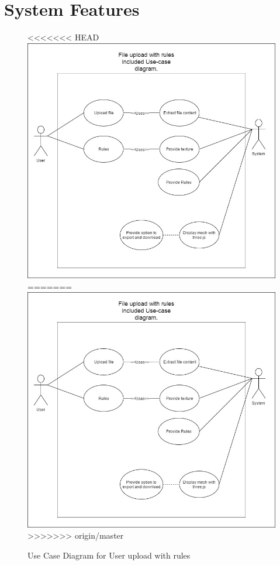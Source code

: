 \documentclass[english]{article}
\begin{document}
	\section{System Features}
		\begin{figure}[h]
<<<<<<< HEAD
			\includegraphics[width=\textwidth]{rules.jpg}
=======
			\includegraphics[width=\textwidth]{Use Cases/rules.jpg}
>>>>>>> origin/master
			\caption{Use Case Diagram for User upload with rules }
		\end{figure}
		
\end{document}

